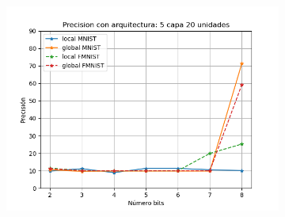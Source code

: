 \begin{figure}[H]
\begin{subfigure}[H]{0.45\textwidth}
    \includegraphics[width=\textwidth]{imagenes/fa/Precision con arquitectura: 5 capa 20 unidades.png} 
    \end{subfigure}
\end{figure}


